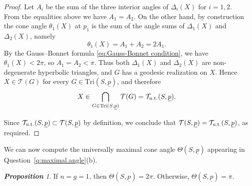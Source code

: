 \documentclass[11pt, letterpaper]{amsart}
\theoremstyle{definition}
\theoremstyle{remark}
\newtheorem{proposition}[theorem]{\rm\bf Proposition}
\newcommand{\up}{\underline{p}}
\newcommand{\Sp}{(S,\up)}
\newcommand{\TSp}{\text{Tri}\Sp}
\newcommand{\cT}{\mathcal{T}}
\newcommand{\cTp}{\mathcal{T} (S,\up)}
\numberwithin{equation}{section}
\begin{document}
\begin{proof}
Let \(A_i\) be the sum of the three interior angles of \(\Delta_i(X)\) for \(i=1,2\).
From the equalities above we have \(A_1=A_2\).
On the other hand, by construction the cone angle \(\theta_1(X)\) at \(p_1\) is the sum of the angle sums of \(\Delta_1(X)\) and \(\Delta_2(X)\), namely
\[
\theta_1(X)=A_1+A_2=2A_1.
\]
By the Gauss–Bonnet formula \eqref{eq:Gauss-Bonnet condition}, we have \(\theta_1(X)<2\pi\), so \(A_1=A_2<\pi\).
Thus both \(\Delta_1(X)\) and \(\Delta_2(X)\) are non-degenerate hyperbolic triangles, and $G$ has a geodesic realization on $X$.
Hence \(X\in\cT(G)\) for every \(G\in\TSp\), and therefore
\[
X\in\bigcap_{G\in\TSp}\cT(G)=\cT_{\rm u.t.}(S,\up).
\]

Since \(\cT_{\rm u.t.}\Sp\subset\cTp\) by definition, we conclude that \(\cTp=\cT_{\rm u.t.}\Sp\), as required.
\end{proof}

We can now compute the universally maximal cone angle \(\Theta(S,\up)\) appearing in Question~\ref{q:maximal.angle}(b).

\begin{proposition}
\label{prop:max.cone.angle}
If \(n=g=1\), then \(\Theta\Sp = 2\pi\). Otherwise, \(\Theta\Sp = \pi\).
\end{proposition}
\end{document}

